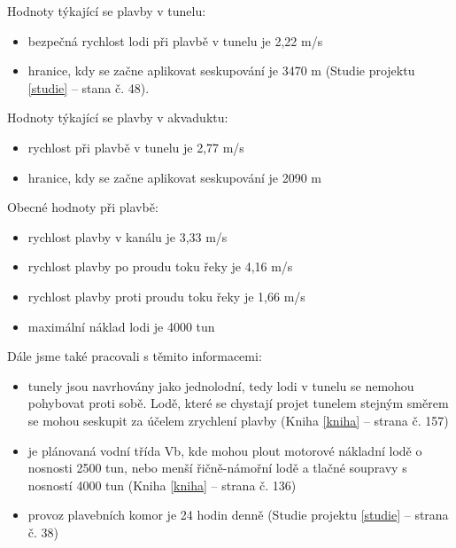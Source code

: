 \documentclass[11pt,a4paper]{article}
\begin{document}
    \noindent
    Hodnoty týkající se plavby v tunelu:

    \begin{itemize}
      \item bezpečná rychlost lodi při plavbě v tunelu je 2,22 m/s

      \item hranice, kdy se začne aplikovat seskupování je 3470 m
            (Studie projektu \ref{studie} -- stana č. 48).
    \end{itemize}

    \noindent
    Hodnoty týkající se plavby v akvaduktu:

    \begin{itemize}
      \item rychlost při plavbě v tunelu je 2,77 m/s
      \item hranice, kdy se začne aplikovat seskupování je 2090 m
    \end{itemize}

    \break

    \noindent
    Obecné hodnoty při plavbě:

    \begin{itemize}
      \item rychlost plavby v kanálu je 3,33 m/s
      \item rychlost plavby po proudu toku řeky je 4,16 m/s
      \item rychlost plavby proti proudu toku řeky je 1,66 m/s
      \item maximální náklad lodi je 4000 tun
    \end{itemize}

    \noindent
    Dále jsme také pracovali s těmito informacemi:

    \begin{itemize}
      \item tunely jsou navrhovány jako jednolodní, tedy lodi v tunelu se
            nemohou pohybovat proti sobě. Lodě, které se chystají projet
            tunelem stejným směrem se mohou seskupit za účelem zrychlení plavby
            (Kniha \ref{kniha} -- strana č. 157)
      \item je plánovaná vodní třída Vb, kde mohou plout motorové nákladní lodě
            o nosnosti 2500 tun, nebo menší řičně-námořní lodě a tlačné
            soupravy s nosností 4000 tun
            (Kniha \ref{kniha} -- strana č. 136)
      \item provoz plavebních komor je 24 hodin denně
            (Studie projektu \ref{studie} -- strana č. 38)
    \end{itemize}
        
\end{document}
